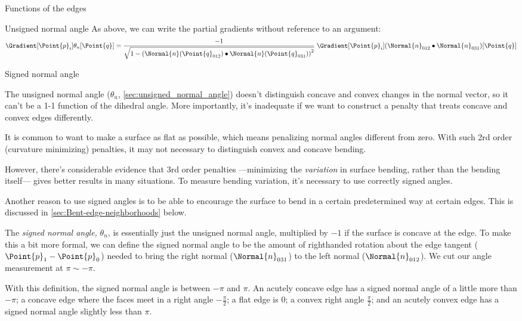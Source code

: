 \begin{plSection}{Functions of the edges}
\begin{plSection}{Unsigned normal angle}
As above, we can write the partial gradients without reference to an argument:
\begin{equation}
\Gradient[\Point{p}_i]{\theta_u}[\Point{q}]
=
\frac{-1}
{
\sqrt{
1 - 
\left( 
\Normal{n}(\Point{q}_{012}) \bullet \Normal{n}(\Point{q}_{031}) 
\right)^2
} 
}
\; \Gradient[\Point{p}_i]{\left(\Normal{n}_{012}\bullet\Normal{n}_{031}\right)}[\Point{q}]
\end{equation}

\end{plSection}%

\begin{plSection}{Signed normal angle}
\label{sec:signed_normal_angle}

The unsigned normal angle
($\theta_u$, \cref{sec:unsigned_normal_angle})
doesn't distinguish concave and convex changes in the normal vector,
so it can't be a 1-1 function of the dihedral angle.
More importantly, it's inadequate if we want to construct
a penalty that treats concave and convex edges differently.

It is common to want to make a surface as flat as possible,
which means penalizing normal angles different from zero.
With such 2rd order (curvature minimizing) penalties, 
it may not necessary to distinguish
convex and concave bending.

However, there's considerable evidence that
$3$rd order penalties ---minimizing the {\it variation}
in surface bending, rather than the bending itself---
gives better results in many situations.
To measure bending variation, it's necessary
to use correctly signed angles.

Another reason to use signed angles is to be able
to encourage the surface to bend in a certain
predetermined way at certain edges.
This is discussed in \cref{sec:Bent-edge-neighborhoods}
below.

The {\it signed normal angle,} $\theta_n$,
is essentially just the
unsigned normal angle, multiplied by $-1$ if the surface is
concave at the edge.
To make this a bit more formal,
we can define the signed normal angle to be the amount
of righthanded rotation about the edge tangent 
($\Point{p}_1 - \Point{p}_0$)
needed to bring the right normal ($\Normal{n}_{031}$) to
the left normal ($\Normal{n}_{012}$).
We cut our angle measurement at $\pi \sim -\pi$.

With this definition, the signed normal angle
is between $-\pi$ and $\pi$.
An acutely concave edge has a signed normal angle
of a little more than $-\pi$;
a concave edge where the faces meet in a right angle
$-\frac{\pi}{2}$;
a flat edge is $0$;
a convex right angle $\frac{\pi}{2}$;
and an acutely convex edge has a signed normal angle
slightly less than $\pi$.


\end{plSection}
\end{plSection}

